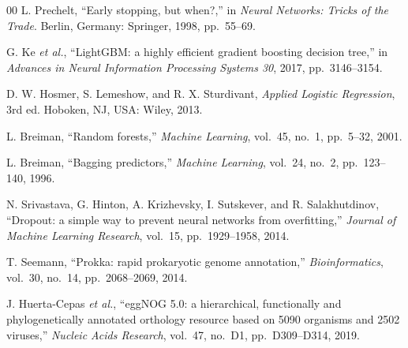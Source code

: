 \documentclass[journal]{IEEEtran}
\begin{document}
\begin{thebibliography}{00}
 L. Prechelt, ``Early stopping, but when?,'' in \textit{Neural Networks: Tricks of the Trade}. Berlin, Germany: Springer, 1998, pp.~55--69.

 G. Ke \textit{et al.}, ``LightGBM: a highly efficient gradient boosting decision tree,'' in \textit{Advances in Neural Information Processing Systems 30}, 2017, pp.~3146--3154.

 D. W. Hosmer, S. Lemeshow, and R. X. Sturdivant, \textit{Applied Logistic Regression}, 3rd ed. Hoboken, NJ, USA: Wiley, 2013.

 L. Breiman, ``Random forests,'' \textit{Machine Learning}, vol.~45, no.~1, pp.~5--32, 2001.

 L. Breiman, ``Bagging predictors,'' \textit{Machine Learning}, vol.~24, no.~2, pp.~123--140, 1996.

 N. Srivastava, G. Hinton, A. Krizhevsky, I. Sutskever, and R. Salakhutdinov, ``Dropout: a simple way to prevent neural networks from overfitting,'' \textit{Journal of Machine Learning Research}, vol.~15, pp.~1929--1958, 2014.

 T. Seemann, ``Prokka: rapid prokaryotic genome annotation,'' \textit{Bioinformatics}, vol.~30, no.~14, pp.~2068--2069, 2014.

 J. Huerta-Cepas \textit{et al.}, ``eggNOG 5.0: a hierarchical, functionally and phylogenetically annotated orthology resource based on 5090 organisms and 2502 viruses,'' \textit{Nucleic Acids Research}, vol.~47, no.~D1, pp.~D309--D314, 2019.

\end{thebibliography}
\end{document}
